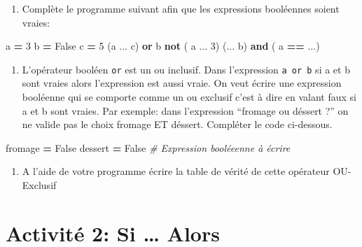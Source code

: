 \documentclass[
]{book}
\newenvironment{Shaded}{\begin{snugshade}}{\end{snugshade}}
\newcommand{\CommentTok}[1]{\textcolor[rgb]{0.56,0.35,0.01}{\textit{#1}}}
\newcommand{\DecValTok}[1]{\textcolor[rgb]{0.00,0.00,0.81}{#1}}
\newcommand{\KeywordTok}[1]{\textcolor[rgb]{0.13,0.29,0.53}{\textbf{#1}}}
\newcommand{\NormalTok}[1]{#1}
\newcommand{\OperatorTok}[1]{\textcolor[rgb]{0.81,0.36,0.00}{\textbf{#1}}}
\newcommand{\VariableTok}[1]{\textcolor[rgb]{0.00,0.00,0.00}{#1}}
\providecommand{\tightlist}{%
  \setlength{\itemsep}{0pt}\setlength{\parskip}{0pt}}
\def\tightlist{}
\begin{document}
\begin{enumerate}
\def\labelenumi{\arabic{enumi}.}
\setcounter{enumi}{2}
\tightlist
\item
  Complète le programme suivant afin que les expressions booléennes soient vraies:
\end{enumerate}

\begin{Shaded}
\begin{Highlighting}[]
\NormalTok{a }\OperatorTok{=} \DecValTok{3}
\NormalTok{b }\OperatorTok{=} \VariableTok{False}
\NormalTok{c }\OperatorTok{=} \DecValTok{5}
\NormalTok{(a ... c) }\KeywordTok{or}\NormalTok{ b}
\KeywordTok{not}\NormalTok{ ( a ... }\DecValTok{3}\NormalTok{)}
\NormalTok{(... b) }\KeywordTok{and}\NormalTok{ ( a }\OperatorTok{==}\NormalTok{ ...) }
\end{Highlighting}
\end{Shaded}

\begin{enumerate}
\def\labelenumi{\arabic{enumi}.}
\setcounter{enumi}{3}
\tightlist
\item
  L'opérateur booléen \texttt{or} est un ou inclusif. Dans l'expression \texttt{a\ or\ b} si a et b sont vraies alors l'expression est aussi vraie. On veut écrire une expression booléenne qui se comporte comme un ou exclusif c'est à dire en valant faux si a et b sont vraies. Par exemple: dans l'expression ``fromage ou déssert ?'' on ne valide pas le choix fromage ET déssert. Compléter le code ci-dessous.
\end{enumerate}

\begin{Shaded}
\begin{Highlighting}[]
\NormalTok{fromage }\OperatorTok{=} \VariableTok{False}
\NormalTok{dessert }\OperatorTok{=} \VariableTok{False}
\CommentTok{\# Expression booléeenne à écrire}
\end{Highlighting}
\end{Shaded}

\begin{enumerate}
\def\labelenumi{\arabic{enumi}.}
\setcounter{enumi}{4}
\tightlist
\item
  A l'aide de votre programme écrire la table de vérité de cette opérateur OU-Exclusif
  \newpage
\end{enumerate}

\hypertarget{activituxe9-2-si-alors}{%
\section{Activité 2: Si \ldots{} Alors}\label{activituxe9-2-si-alors}}
\end{document}
